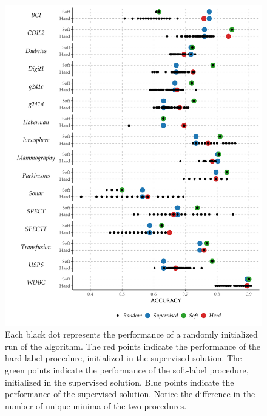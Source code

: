 \documentclass[twoside]{memoir}\usepackage[]{graphicx}\usepackage{xcolor}
\makeatletter
\def\maxwidth{ %
  \ifdim\Gin@nat@width>\linewidth
    \linewidth
  \else
    \Gin@nat@width
  \fi
}
\newenvironment{knitrout}{}{} %
\makeatother
\begin{document}
\begin{knitrout}
\color{fgcolor}\begin{figure}
\includegraphics[width=\maxwidth]{figure/localoptima-1} \caption[Each black dot represents the performance of a randomly initialized run of the algorithm]{Each black dot represents the performance of a randomly initialized run of the algorithm. The red points indicate the performance of the hard-label procedure, initialized in the supervised solution. The green points indicate the performance of the soft-label procedure, initialized in the supervised solution. Blue points indicate the performance of the supervised solution. Notice the difference in the number of unique minima of the two procedures.}\label{fig:localoptima}
\end{figure}


\end{knitrout}
\end{document}
